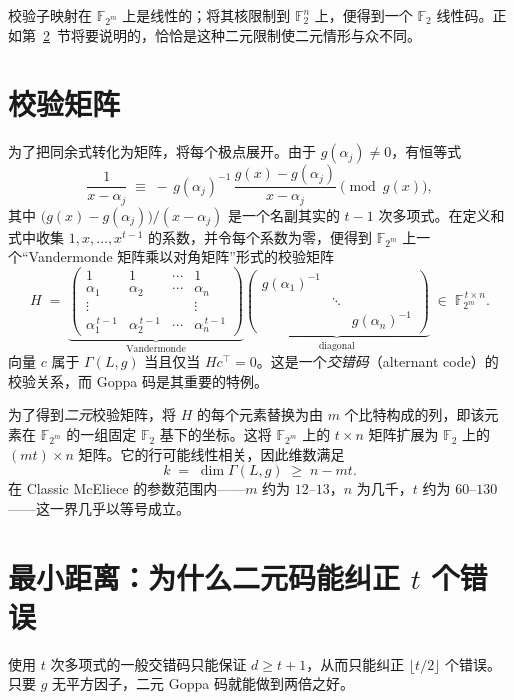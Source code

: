 校验子映射在 $\mathbb{F}_{2^m}$ 上是线性的；将其核限制到 $\mathbb{F}_2^n$ 上，便得到一个 $\mathbb{F}_2$ 线性码。正如第~\ref{sec:goppa-distance}~节将要说明的，恰恰是这种二元限制使二元情形与众不同。

\section{校验矩阵}

为了把同余式转化为矩阵，将每个极点展开。由于 $g(\alpha_j)\neq 0$，有恒等式
\[
\frac{1}{x-\alpha_j} \;\equiv\; -\,g(\alpha_j)^{-1}\,\frac{g(x)-g(\alpha_j)}{x-\alpha_j} \pmod{g(x)},
\]
其中 $\big(g(x)-g(\alpha_j)\big)/(x-\alpha_j)$ 是一个名副其实的 $t-1$ 次多项式。在定义和式中收集 $1,x,\dots,x^{t-1}$ 的系数，并令每个系数为零，便得到 $\mathbb{F}_{2^m}$ 上一个“Vandermonde 矩阵乘以对角矩阵”形式的校验矩阵
\[
H \;=\;
\underbrace{\begin{pmatrix}
1 & 1 & \cdots & 1\\
\alpha_1 & \alpha_2 & \cdots & \alpha_n\\
\vdots & & & \vdots\\
\alpha_1^{\,t-1} & \alpha_2^{\,t-1} & \cdots & \alpha_n^{\,t-1}
\end{pmatrix}}_{\text{Vandermonde}}
\underbrace{\begin{pmatrix}
g(\alpha_1)^{-1} & & \\
 & \ddots & \\
 & & g(\alpha_n)^{-1}
\end{pmatrix}}_{\text{diagonal}}
\;\in\; \mathbb{F}_{2^m}^{\,t\times n}.
\]
向量 $c$ 属于 $\Gamma(L,g)$ 当且仅当 $H c^{\top}=0$。这是一个\emph{交错码}（alternant code）的校验关系，而 Goppa 码是其重要的特例。

为了得到\emph{二元}校验矩阵，将 $H$ 的每个元素替换为由 $m$ 个比特构成的列，即该元素在 $\mathbb{F}_{2^m}$ 的一组固定 $\mathbb{F}_2$ 基下的坐标。这将 $\mathbb{F}_{2^m}$ 上的 $t\times n$ 矩阵扩展为 $\mathbb{F}_2$ 上的 $(mt)\times n$ 矩阵。它的行可能线性相关，因此维数满足
\[
k \;=\; \dim \Gamma(L,g) \;\ge\; n - m t .
\]
在 Classic McEliece 的参数范围内——$m$ 约为 $12$--$13$，$n$ 为几千，$t$ 约为 $60$--$130$——这一界几乎以等号成立。

\section{最小距离：为什么二元码能纠正 \texorpdfstring{$t$}{t} 个错误}
\label{sec:goppa-distance}

使用 $t$ 次多项式的一般交错码只能保证 $d \ge t+1$，从而只能纠正 $\lfloor t/2\rfloor$ 个错误。只要 $g$ 无平方因子，二元 Goppa 码就能做到两倍之好。

